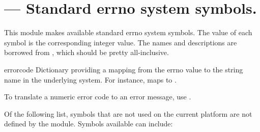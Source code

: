 \section{ ---
         Standard errno system symbols.}




This module makes available standard errno system symbols.
The value of each symbol is the corresponding integer value.
The names and descriptions are borrowed from ,
which should be pretty all-inclusive.

\begin{datadesc}{errorcode}
  Dictionary providing a mapping from the errno value to the string
  name in the underlying system.  For instance,
   maps to .
\end{datadesc}

To translate a numeric error code to an error message, use
.

Of the following list, symbols that are not used on the current
platform are not defined by the module.  Symbols available can
include:

